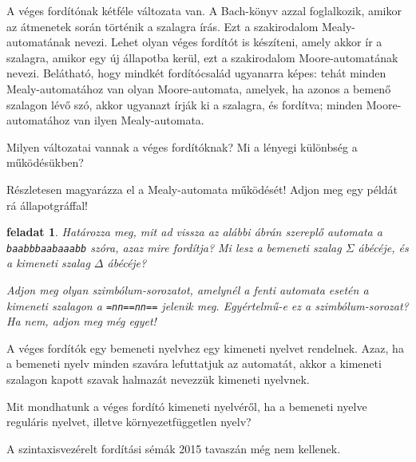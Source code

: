 \documentclass[a4paper]{article}
\newtheorem{feladat}{feladat}[section]
\begin{document}
A véges fordítónak kétféle változata van. A Bach-könyv azzal
foglalkozik, amikor az átmenetek során történik a szalagra írás. Ezt a
szakirodalom Mealy-automatának nevezi. Lehet olyan véges fordítót is
készíteni, amely akkor ír a szalagra, amikor egy új állapotba kerül, ezt
a szakirodalom Moore-automatának nevezi. Belátható, hogy mindkét
fordítócsalád ugyanarra képes: tehát minden Mealy-automatához van olyan
Moore-automata, amelyek, ha azonos a bemenő szalagon lévő szó, akkor
ugyanazt írják ki a szalagra, és fordítva; minden Moore-automatához van
ilyen Mealy-automata.

Milyen változatai vannak a véges fordítóknak? Mi a lényegi különbség a
működésükben?

Részletesen magyarázza el a Mealy-automata működését! Adjon meg egy
példát rá állapotgráffal!

\begin{feladat}
Határozza meg, mit ad vissza az alábbi ábrán szereplő automata
a \verb!baabbbaabaaabb!  szóra, azaz mire fordítja?
Mi lesz a bemeneti szalag $\Sigma$ ábécéje, és a kimeneti szalag
$\Delta$ ábécéje?


Adjon meg olyan szimbólum-sorozatot, amelynél a fenti automata esetén a
kimeneti szalagon a \verb+=nn==nn==+ jelenik meg. Egyértelmű-e ez a
szimbólum-sorozat? Ha nem, adjon meg még egyet!
\end{feladat}

A véges fordítók egy bemeneti nyelvhez egy kimeneti nyelvet rendelnek.
Azaz, ha a bemeneti nyelv minden szavára lefuttatjuk az automatát,
akkor a kimeneti szalagon kapott szavak halmazát nevezzük kimeneti
nyelvnek.

Mit mondhatunk a véges fordító kimeneti nyelvéről,
ha a bemeneti nyelve reguláris nyelvet, illetve környezetfüggetlen
nyelv?

A szintaxisvezérelt fordítási sémák 2015 tavaszán még nem kellenek.
\end{document}
